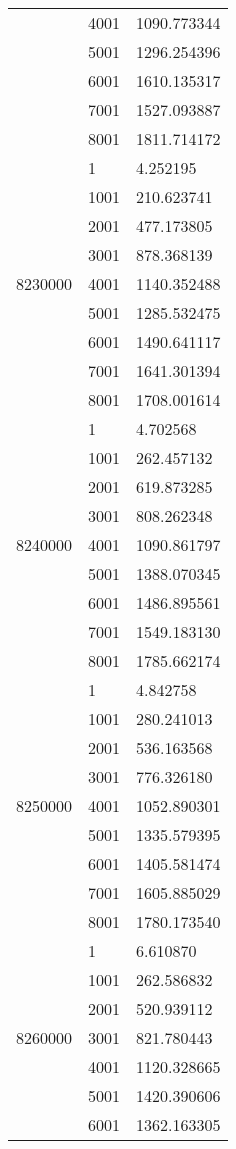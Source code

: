 \begin{table}[htb!]
\begin{tabular}{lll}
 & 4001 & 1090.773344 \\
 & 5001 & 1296.254396 \\
 & 6001 & 1610.135317 \\
 & 7001 & 1527.093887 \\
 & 8001 & 1811.714172 \\
\multirow[c]{9}{*}{8230000} & 1 & 4.252195 \\
 & 1001 & 210.623741 \\
 & 2001 & 477.173805 \\
 & 3001 & 878.368139 \\
 & 4001 & 1140.352488 \\
 & 5001 & 1285.532475 \\
 & 6001 & 1490.641117 \\
 & 7001 & 1641.301394 \\
 & 8001 & 1708.001614 \\
\multirow[c]{9}{*}{8240000} & 1 & 4.702568 \\
 & 1001 & 262.457132 \\
 & 2001 & 619.873285 \\
 & 3001 & 808.262348 \\
 & 4001 & 1090.861797 \\
 & 5001 & 1388.070345 \\
 & 6001 & 1486.895561 \\
 & 7001 & 1549.183130 \\
 & 8001 & 1785.662174 \\
\multirow[c]{9}{*}{8250000} & 1 & 4.842758 \\
 & 1001 & 280.241013 \\
 & 2001 & 536.163568 \\
 & 3001 & 776.326180 \\
 & 4001 & 1052.890301 \\
 & 5001 & 1335.579395 \\
 & 6001 & 1405.581474 \\
 & 7001 & 1605.885029 \\
 & 8001 & 1780.173540 \\
\multirow[c]{9}{*}{8260000} & 1 & 6.610870 \\
 & 1001 & 262.586832 \\
 & 2001 & 520.939112 \\
 & 3001 & 821.780443 \\
 & 4001 & 1120.328665 \\
 & 5001 & 1420.390606 \\
 & 6001 & 1362.163305 \\

\end{tabular}
\end{table}
